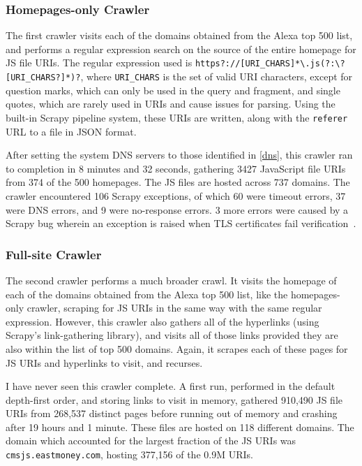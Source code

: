 \subsubsection*{Homepages-only Crawler}\label{homepages-crawler}
The first crawler visits each of the domains obtained from the Alexa top 500 list, and performs a regular expression search on the source of the entire homepage for JS file URIs.
The regular expression used is \texttt{https?://[URI\_CHARS]*\textbackslash{}.js\allowbreak{}(?:\textbackslash{}?[URI\_CHARS?]*)?}, where \texttt{URI\_CHARS} is the set of valid URI characters, except for question marks, which can only be used in the query and fragment, and single quotes, which are rarely used in URIs and cause issues for parsing.
Using the built-in Scrapy pipeline system, these URIs are written, along with the \texttt{referer} URL to a file in JSON format.

After setting the system DNS servers to those identified in \autoref{dns}, this crawler ran to completion in 8 minutes and 32 seconds, gathering 3427 JavaScript file URIs from 374 of the 500 homepages.
The JS files are hosted across 737 domains.
The crawler encountered 106 Scrapy exceptions, of which 60 were timeout errors, 37 were DNS errors, and 9 were no-response errors.
3 more errors were caused by a Scrapy bug wherein an exception is raised when TLS certificates fail verification~\cite{Calderone2015}.
\subsubsection*{Full-site Crawler}
The second crawler performs a much broader crawl.
It visits the homepage of each of the domains obtained from the Alexa top 500 list, like the homepages-only crawler, scraping for JS URIs in the same way with the same regular expression.
However, this crawler also gathers all of the hyperlinks (using Scrapy's link-gathering library), and visits all of those links provided they are also within the list of top 500 domains.
Again, it scrapes each of these pages for JS URIs and hyperlinks to visit, and recurses.

I have never seen this crawler complete.
A first run, performed in the default depth-first order, and storing links to visit in memory, gathered 910,490 JS file URIs from 268,537 distinct pages before running out of memory and crashing after 19 hours and 1 minute.
These files are hosted on 118 different domains.
The domain which accounted for the largest fraction of the JS URIs was \texttt{cmsjs.eastmoney.com}, hosting 377,156 of the 0.9M URIs.

